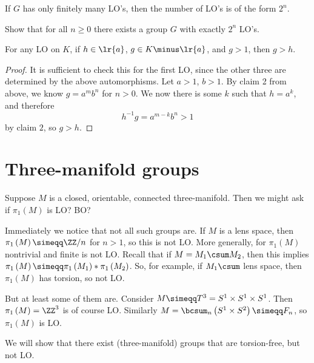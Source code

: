 \begin{fact}
If $G$ has only finitely many LO's, then the number of LO's is of the form $2^n$.
\end{fact}

\begin{exr}
Show that for all $n\geq 0$ there exists a group $G$ with exactly $2^n$ LO's.
\end{exr}

\begin{cor}
For any LO on $K$, if $h\in \lr{a}$, $g\in K\minus \lr{a}$, and $g > 1$, then $g > h$.
\label{cor:1.15}
\end{cor}

\begin{proof}
It is sufficient to check this for the first LO, since the other three are determined by
the above automorphisms. 
Let $a > 1$, $b > 1$.
By claim 2 from above, we know $g = a^m b^n$ for $n > 0$. We now there is some $k$ such
that $h = a^k$, and therefore
\begin{equation}
h^{-1} g = a^{m-k} b^n > 1
\end{equation}
by claim $2$, so $g > h$.
\end{proof}

\section{Three-manifold groups}

Suppose $M$ is a closed, orientable, connected three-manifold.
Then we might ask if $\pi_1\left(M\right)$ is LO? BO?

Immediately we notice that not all such groups are.
If $M$ is a lens space, then $\pi_1\left(M\right) \simeqq \ZZ / n$ for $n > 1$, so this is
not LO.
More generally, for $\pi_1\left(M\right)$ nontrivial and finite is not LO.
Recall that if $M= M_1 \csum M_2$, then this implies $\pi_1\left(M\right)\simeqq
\pi_1\left(M_1\right) * \pi_1\left(M_2\right)$.
So, for example, if $M_1 \csum$ lens space, then $\pi_1\left(M\right)$ has torsion, so not
LO.

But at least some of them are.
Consider $M\simeqq T^3 = S^1\times S^1 \times S^1$. Then $\pi_1\left(M\right) = \ZZ^3$
is of course LO.
Similarly $M = \bcsum_n\left(S^1 \times S^2\right)\simeqq F_n$, so $\pi_1\left(M\right)$
is LO.

We will show that there exist (three-manifold) groups that are torsion-free, but not LO.

